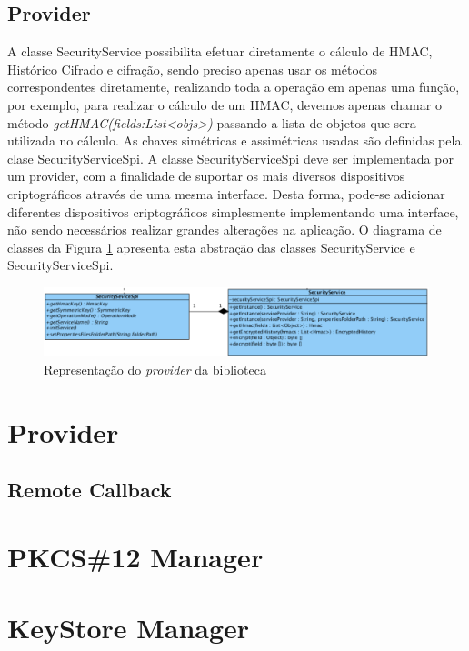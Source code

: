 \subsection{Provider}


A classe SecurityService possibilita efetuar diretamente o cálculo de \ac{HMAC}, Hist\'{o}rico Cifrado e cifração, sendo preciso apenas usar os m\'{e}todos correspondentes diretamente,
 realizando toda a opera\c{c}\~{a}o em apenas uma fun\c{c}\~{a}o, por exemplo, para realizar o cálculo de um \ac{HMAC}, devemos apenas chamar o método \textit{getHMAC(fields:List<objs>)} 
 passando a lista de objetos que sera utilizada no cálculo. As chaves simétricas e assimétricas usadas são definidas pela clase SecurityServiceSpi.
A classe SecurityServiceSpi deve ser implementada por um provider, com a finalidade de suportar os mais diversos dispositivos criptogr\'{a}ficos atrav\'{e}s de uma mesma interface. 
Desta forma, pode-se adicionar diferentes dispositivos criptográficos simplesmente implementando uma interface, não sendo necessários realizar grandes alterações na aplicação. 
O diagrama de classes da Figura \ref{figura:diagramProvider} apresenta esta abstração das classes SecurityService e SecurityServiceSpi.

\begin{figure}[ht]
\begin{center}
\includegraphics[width=\textwidth]{images/provider.png}
\caption{Representa\c{c}\~{a}o do \textit{provider} da biblioteca} \label{figura:diagramProvider}
\end{center}
\end{figure}

\section{Provider}

\subsection{Remote Callback}


\section{PKCS\#12 Manager}


\section{KeyStore Manager}
